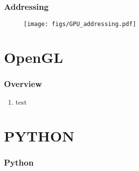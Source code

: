 \begin{frame}\frametitle{Addressing}\logoEvolution
	\begin{figure}
		\texttt{[image: figs/GPU\_addressing.pdf]}
	\end{figure}
\end{frame}



\section{OpenGL}
\begin{frame}\frametitle{Overview}\logoEvolution\mypagenum
	\begin{enumerate}\tiny
		\item test
	\end{enumerate}
\end{frame}


\section{PYTHON}
\begin{frame}
\frametitle{Python}
\framesubtitle{}
\logoCSIPCPL\mypagenum
\end{frame}



